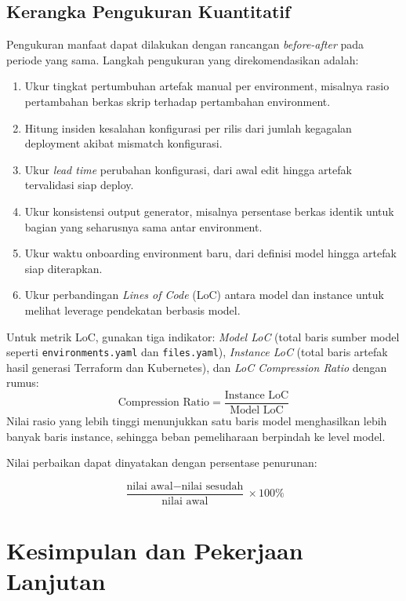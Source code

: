 \subsection[Kerangka Pengukuran Kuantitatifsubsec]{Kerangka Pengukuran Kuantitatif}\label{subsec:mde-pengukuran-kuantitatif}

Pengukuran manfaat dapat dilakukan dengan rancangan \textit{before-after} pada periode yang sama. Langkah pengukuran yang direkomendasikan adalah:
\begin{enumerate}
    \item Ukur tingkat pertumbuhan artefak manual per environment, misalnya rasio pertambahan berkas skrip terhadap pertambahan environment.
    \item Hitung insiden kesalahan konfigurasi per rilis dari jumlah kegagalan deployment akibat mismatch konfigurasi.
    \item Ukur \textit{lead time} perubahan konfigurasi, dari awal edit hingga artefak tervalidasi siap deploy.
    \item Ukur konsistensi output generator, misalnya persentase berkas identik untuk bagian yang seharusnya sama antar environment.
    \item Ukur waktu onboarding environment baru, dari definisi model hingga artefak siap diterapkan.
    \item Ukur perbandingan \textit{Lines of Code} (LoC) antara model dan instance untuk melihat leverage pendekatan berbasis model.
\end{enumerate}

Untuk metrik LoC, gunakan tiga indikator: \textit{Model LoC} (total baris sumber model seperti \texttt{environments.yaml} dan \texttt{files.yaml}), \textit{Instance LoC} (total baris artefak hasil generasi Terraform dan Kubernetes), dan \textit{LoC Compression Ratio} dengan rumus:
$$
\text{Compression Ratio} = \frac{\text{Instance LoC}}{\text{Model LoC}}
$$
Nilai rasio yang lebih tinggi menunjukkan satu baris model menghasilkan lebih banyak baris instance, sehingga beban pemeliharaan berpindah ke level model.

Nilai perbaikan dapat dinyatakan dengan persentase penurunan: 

$$
\frac{\text{nilai awal} - \text{nilai sesudah}}{\text{nilai awal}} \times 100\%
$$

\section[Kesimpulan dan Pekerjaan Lanjutansec]{Kesimpulan dan Pekerjaan Lanjutan}\label{sec:mde-kesimpulan}

